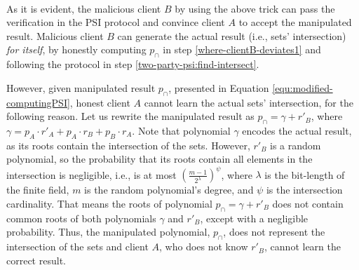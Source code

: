 \


   As it is evident, the malicious client $B$ by using the above trick can pass the verification in the PSI protocol and convince client $A$ to accept the manipulated result.  Malicious client $B$ can generate the actual result (i.e., sets' intersection) \emph{for itself}, by   honestly computing  $p_{\scriptscriptstyle \cap}$ in step \ref{where-clientB-deviates1} and following the protocol in   step \ref{two-party-psi:find-intersect}. 
   
   
   However, given  manipulated result $p_{\scriptscriptstyle \cap}$, presented in Equation \ref{equ:modified-computingPSI}, honest client $A$ cannot learn  the actual sets' intersection, for the following reason. Let us  rewrite the manipulated result as $p_{\scriptscriptstyle \cap}=  \gamma+ r'_{\scriptscriptstyle B}$, where $\gamma=p_{\scriptscriptstyle A}\cdot r'_{\scriptscriptstyle A}+p_{\scriptscriptstyle A}\cdot r_{\scriptscriptstyle B}+p_{\scriptscriptstyle B}\cdot r_{\scriptscriptstyle A}$. Note that polynomial $\gamma$ encodes the actual result, as its roots contain the intersection of the sets. However, $ r'_{\scriptscriptstyle B}$ is a random polynomial, so the probability that its roots contain all  elements in the intersection is negligible, i.e., is at most $(\frac{m-1}{2^{\scriptscriptstyle {\scriptscriptstyle\lambda}}})^{\scriptscriptstyle\psi}$, where $\lambda$ is the bit-length of the finite field, $m$ is the random polynomial's degree, and $\psi$ is the intersection cardinality. That means the roots of polynomial $p_{\scriptscriptstyle \cap}=  \gamma+ r'_{\scriptscriptstyle B}$ does not contain common roots of both polynomials  $\gamma$ and $r'_{\scriptscriptstyle B}$, except with a negligible probability. Thus, the manipulated polynomial, $p_{\scriptscriptstyle \cap}$, does not represent the intersection of the sets and client $A$, who does not know $r'_{\scriptscriptstyle B}$, cannot learn the correct result.  
   
   
   \
   
   
   
